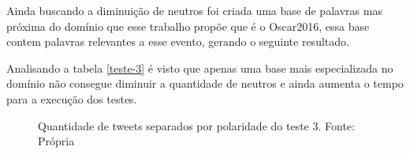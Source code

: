 Ainda buscando a diminuição de neutros foi criada uma base de palavras mas próxima do domínio que esse trabalho propõe que é o Oscar2016, essa base contem palavras relevantes a esse evento, gerando o seguinte resultado.

\begin{table}[]
	\caption{3º teste}
	\label{teste-3}
\end{table}

Analisando a tabela \ref{teste-3} é visto que apenas uma base mais especializada no domínio não consegue diminuir a quantidade de neutros e ainda aumenta o tempo para a execução dos testes.
\begin{figure}[!h]
	\centering{}
	\caption{Quantidade de tweets separados por polaridade do teste 3. Fonte: Própria}
	\label{teste-graf-3}
\end{figure}

